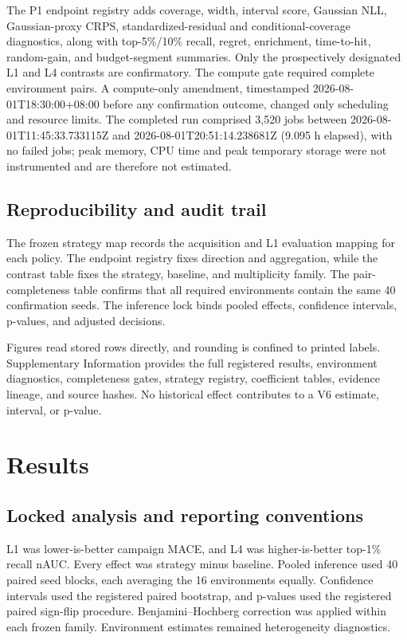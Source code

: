 \documentclass[10pt]{article}
\begin{document}
The P1 endpoint registry adds coverage, width, interval score, Gaussian NLL,
Gaussian-proxy CRPS, standardized-residual and conditional-coverage
diagnostics, along with top-5\%/10\% recall, regret, enrichment, time-to-hit,
random-gain, and budget-segment summaries. Only the prospectively designated
L1 and L4 contrasts are confirmatory. The compute gate required complete environment pairs. A compute-only amendment, timestamped 2026-08-01T18:30:00+08:00 before any confirmation outcome, changed only scheduling and resource limits. The completed run comprised 3,520 jobs between 2026-08-01T11:45:33.733115Z and 2026-08-01T20:51:14.238681Z (9.095 h elapsed), with no failed jobs; peak memory, CPU time and peak temporary storage were not instrumented and are therefore not estimated.

\subsection{Reproducibility and audit trail}
The frozen strategy map records the acquisition and L1 evaluation mapping for
each policy. The endpoint registry fixes direction and aggregation, while the
contrast table fixes the strategy, baseline, and multiplicity family. The
pair-completeness table confirms that all required environments contain the
same 40 confirmation seeds. The inference lock binds pooled effects,
confidence intervals, p-values, and adjusted decisions.

Figures read stored rows directly, and rounding is confined to printed
labels. Supplementary Information provides the full registered results,
environment diagnostics, completeness gates, strategy registry, coefficient
tables, evidence lineage, and source hashes. No historical effect contributes
to a V6 estimate, interval, or p-value.

\section{Results}
\subsection{Locked analysis and reporting conventions}
L1 was lower-is-better campaign MACE, and L4 was higher-is-better top-1\%
recall nAUC. Every effect was strategy minus baseline. Pooled inference used
40 paired seed blocks, each averaging the 16 environments equally.
Confidence intervals used the registered paired bootstrap, and p-values used
the registered paired sign-flip procedure. Benjamini--Hochberg correction was
applied within each frozen family. Environment estimates remained
heterogeneity diagnostics.
\end{document}
